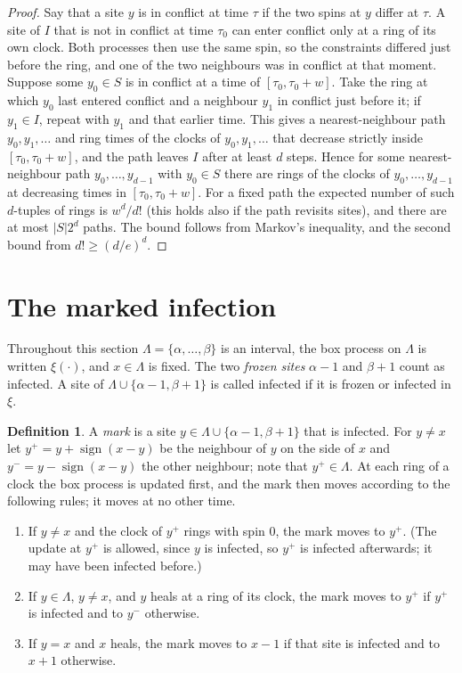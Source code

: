 \documentclass[11pt]{amsart}
\theoremstyle{definition}
\newtheorem{definition}[theorem]{Definition}
\theoremstyle{remark}
\begin{document}
\begin{proof}
Say that a site $y$ is in conflict at time $\tau$ if the two spins at $y$ differ at $\tau$. A site of $I$ that is not in
conflict at time $\tau_0$ can enter conflict only at a ring of its own clock. Both processes then use the same spin, so
the constraints differed just before the ring, and one of the two neighbours was in conflict at that moment. Suppose some
$y_0\in S$ is in conflict at a time of $[\tau_0,\tau_0+w]$. Take the ring at which $y_0$ last entered conflict and a
neighbour $y_1$ in conflict just before it; if $y_1\in I$, repeat with $y_1$ and that earlier time. This gives a
nearest-neighbour path $y_0,y_1,\dots$ and ring times of the clocks of $y_0,y_1,\dots$ that decrease strictly inside
$[\tau_0,\tau_0+w]$, and the path leaves $I$ after at least $d$ steps. Hence for some nearest-neighbour path
$y_0,\dots,y_{d-1}$ with $y_0\in S$ there are rings of the clocks of $y_0,\dots,y_{d-1}$ at decreasing times in
$[\tau_0,\tau_0+w]$. For a fixed path the expected number of such $d$-tuples of rings is $w^d/d!$ (this holds also if the
path revisits sites), and there are at most $|S|2^{d}$ paths. The bound follows from Markov's inequality, and the second
bound from $d!\ge(d/e)^d$.
\end{proof}

\section{The marked infection}\label{sec:mark}

Throughout this section $\Lambda=\{\alpha,\dots,\beta\}$ is an interval, the box process on $\Lambda$ is written $\xi(\cdot)$, and
$x\in\Lambda$ is fixed. The two \emph{frozen sites} $\alpha-1$ and $\beta+1$ count as infected. A site of $\Lambda\cup\{\alpha-1,\beta+1\}$
is called infected if it is frozen or infected in $\xi$.

\begin{definition}\label{def:mark}
A \emph{mark} is a site $y\in\Lambda\cup\{\alpha-1,\beta+1\}$ that is infected. For $y\ne x$ let $y^+=y+\operatorname{sign}(x-y)$
be the neighbour of $y$ on the side of $x$ and $y^-=y-\operatorname{sign}(x-y)$ the other neighbour; note that $y^+\in\Lambda$.
At each ring of a clock the box process is updated first, and the mark then moves according to the following rules; it
moves at no other time.
\begin{enumerate}
\item If $y\ne x$ and the clock of $y^+$ rings with spin $0$, the mark moves to $y^+$. (The update at $y^+$ is
allowed, since $y$ is infected, so $y^+$ is infected afterwards; it may have been infected before.)
\item If $y\in\Lambda$, $y\ne x$, and $y$ heals at a ring of its clock, the mark moves to $y^+$ if $y^+$ is infected and
to $y^-$ otherwise.
\item If $y=x$ and $x$ heals, the mark moves to $x-1$ if that site is infected and to $x+1$ otherwise.
\end{enumerate}
\end{definition}
\end{document}
